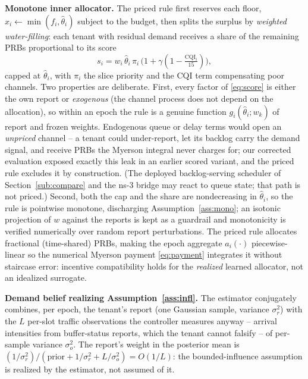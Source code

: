 \documentclass[conference]{IEEEtran}
\theoremstyle{definition}
\theoremstyle{remark}
\newcommand{\Ep}{L}
\newcommand{\type}{\theta}
\newcommand{\wt}{w}
\newcommand{\flo}{f}
\begin{document}
\textbf{Monotone inner allocator.} The priced rule first reserves each floor, $x_i\!\leftarrow\!\min(\flo_i,\hat\type_i)$ subject to the budget, then splits the surplus by \emph{weighted water-filling}: each tenant with residual demand receives a share of the remaining PRBs proportional to its score
\begin{equation}\label{eq:score}
s_i = \wt_i\,\hat\type_i\,\pi_i\,\big(1+\gamma(1-\tfrac{\text{CQI}_i}{15})\big),
\end{equation}
capped at $\hat\type_i$, with $\pi_i$ the slice priority and the CQI term compensating poor channels. Two properties are deliberate. First, every factor of \eqref{eq:score} is either the own report or \emph{exogenous} (the channel process does not depend on the allocation), so within an epoch the rule is a genuine function $g_i(\hat\type_i;\wt_k)$ of report and frozen weights. Endogenous queue or delay terms would open an \emph{unpriced} channel -- a tenant could under-report, let its backlog carry the demand signal, and receive PRBs the Myerson integral never charges for; our corrected evaluation exposed exactly this leak in an earlier scored variant, and the priced rule excludes it by construction. (The deployed backlog-serving scheduler of Section~\ref{sub:compare} and the ns-3 bridge may react to queue state; that path is not priced.) Second, both the cap and the share are nondecreasing in $\hat\type_i$, so the rule is pointwise monotone, discharging Assumption~\ref{ass:mono}; an isotonic projection of $\wt$ against the reports is kept as a guardrail and monotonicity is verified numerically over random report perturbations. The priced rule allocates fractional (time-shared) PRBs, making the epoch aggregate $a_i(\cdot)$ piecewise-linear so the numerical Myerson payment \eqref{eq:payment} integrates it without staircase error: incentive compatibility holds for the \emph{realized} learned allocator, not an idealized surrogate.

\textbf{Demand belief realizing Assumption~\ref{ass:infl}.} The estimator conjugately combines, per epoch, the tenant's report (one Gaussian sample, variance $\sigma_r^2$) with the $\Ep$ per-slot traffic observations the controller measures anyway -- arrival intensities from buffer-status reports, which the tenant cannot falsify -- of per-sample variance $\sigma_o^2$. The report's weight in the posterior mean is $(1/\sigma_r^2)/(\mathrm{prior}+1/\sigma_r^2+\Ep/\sigma_o^2)=O(1/\Ep)$: the bounded-influence assumption is realized by the estimator, not assumed of it.
\end{document}
